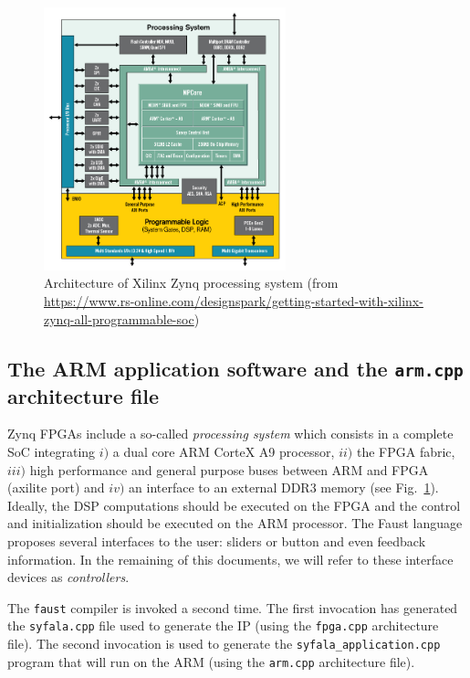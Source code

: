 \documentclass[11pt]{article}
\numberwithin{equation}{section}
\numberwithin{figure}{section}
\begin{document}
\begin{figure}[ht]
  \centerline{\includegraphics[width=7cm]{zynq-mp-core-dual1.png}}
  \caption{Architecture of Xilinx Zynq processing system (from \url{https://www.rs-online.com/designspark/getting-started-with-xilinx-zynq-all-programmable-soc})}
  \label{zynq}
\end{figure}

\subsection{The ARM application software  and the {\tt arm.cpp} architecture file}
\label{sec:arm}

Zynq FPGAs include a so-called {\em processing system} which consists in a complete SoC integrating $i)$ a dual core ARM CorteX A9 processor, $ii)$ the FPGA fabric, $iii)$ high performance and general purpose buses between ARM and FPGA (axilite port) and $iv)$ an interface to an external DDR3 memory (see Fig.~\ref{zynq}). Ideally,  the DSP computations should be executed on the FPGA and the control and initialization should be executed on  the ARM processor.  The Faust language proposes several interfaces to the user: sliders or button and even feedback information. In the remaining of this documents, we will refer to these interface devices as {\em controllers}.  





The {\tt faust}  compiler is invoked a second time. The first invocation  has generated the {\tt syfala.cpp} file used to generate the IP (using the {\tt fpga.cpp} architecture file). The second invocation is used to generate the {\tt syfala\_application.cpp} program that will run on the ARM (using the {\tt arm.cpp} architecture file).
\end{document}
